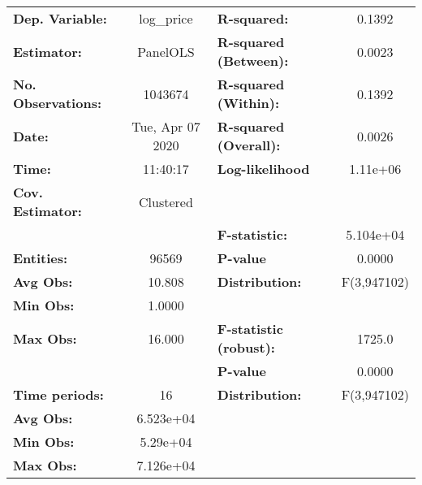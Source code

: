 \documentclass{report}
\begin{document}
\begin{center}
\begin{tabular}{lclc}
\toprule
\textbf{Dep. Variable:}        &     log\_price     & \textbf{  R-squared:         }   &      0.1392      \\
\textbf{Estimator:}            &      PanelOLS      & \textbf{  R-squared (Between):}  &      0.0023      \\
\textbf{No. Observations:}     &      1043674       & \textbf{  R-squared (Within):}   &      0.1392      \\
\textbf{Date:}                 &  Tue, Apr 07 2020  & \textbf{  R-squared (Overall):}  &      0.0026      \\
\textbf{Time:}                 &      11:40:17      & \textbf{  Log-likelihood     }   &     1.11e+06     \\
\textbf{Cov. Estimator:}       &     Clustered      & \textbf{                     }   &                  \\
\textbf{}                      &                    & \textbf{  F-statistic:       }   &    5.104e+04     \\
\textbf{Entities:}             &       96569        & \textbf{  P-value            }   &      0.0000      \\
\textbf{Avg Obs:}              &       10.808       & \textbf{  Distribution:      }   &   F(3,947102)    \\
\textbf{Min Obs:}              &       1.0000       & \textbf{                     }   &                  \\
\textbf{Max Obs:}              &       16.000       & \textbf{  F-statistic (robust):} &      1725.0      \\
\textbf{}                      &                    & \textbf{  P-value            }   &      0.0000      \\
\textbf{Time periods:}         &         16         & \textbf{  Distribution:      }   &   F(3,947102)    \\
\textbf{Avg Obs:}              &     6.523e+04      & \textbf{                     }   &                  \\
\textbf{Min Obs:}              &      5.29e+04      & \textbf{                     }   &                  \\
\textbf{Max Obs:}              &     7.126e+04      & \textbf{                     }   &                  \\
\bottomrule
\end{tabular}
\begin{tabular}{lcccccc}

\end{tabular}
\end{center}
\end{document}
